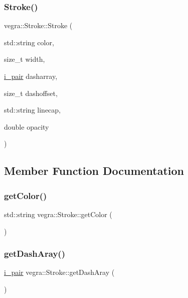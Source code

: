 \subsubsection{\texorpdfstring{Stroke()}{Stroke()}\hspace{0.1cm}{\footnotesize\ttfamily [2/2]}}
{\footnotesize\ttfamily vegra\+::\+Stroke\+::\+Stroke (\begin{DoxyParamCaption}\item[{std\+::string}]{color,  }\item[{size\+\_\+t}]{width,  }\item[{\mbox{\hyperlink{structvegra_1_1Stroke_af5a2b4ee71962d044ebb7a309b22bb8a}{i\+\_\+pair}}}]{dasharray,  }\item[{size\+\_\+t}]{dashoffset,  }\item[{std\+::string}]{linecap,  }\item[{double}]{opacity }\end{DoxyParamCaption})\hspace{0.3cm}{\ttfamily [inline]}}



\subsection{Member Function Documentation}
\mbox{\label{structvegra_1_1Stroke_a6fa9107861ae4898e29baac94866f229}} 
\subsubsection{\texorpdfstring{get\+Color()}{getColor()}}
{\footnotesize\ttfamily std\+::string vegra\+::\+Stroke\+::get\+Color (\begin{DoxyParamCaption}{ }\end{DoxyParamCaption})\hspace{0.3cm}{\ttfamily [inline]}}

\mbox{\label{structvegra_1_1Stroke_ae396487e8776add16ddd78cdd436034f}} 
\subsubsection{\texorpdfstring{get\+Dash\+Aray()}{getDashAray()}}
{\footnotesize\ttfamily \mbox{\hyperlink{structvegra_1_1Stroke_af5a2b4ee71962d044ebb7a309b22bb8a}{i\+\_\+pair}} vegra\+::\+Stroke\+::get\+Dash\+Aray (\begin{DoxyParamCaption}{ }\end{DoxyParamCaption})\hspace{0.3cm}{\ttfamily [inline]}}

